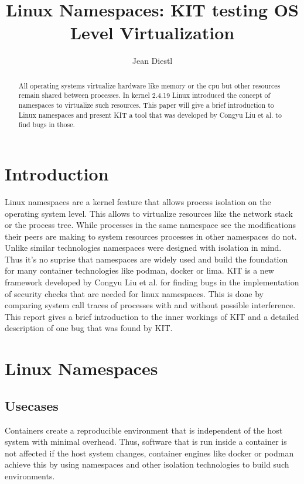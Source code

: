 \documentclass[10pt,twocolumn,a4paper]{article}
\author{Jean Diestl}
\begin{document}
\title{Linux Namespaces: KIT testing OS Level Virtualization}

\newcommand{\todo}[1]{{\texttt{[#1]}}}
\newcommand{\code}[1]{{\tt \small{#1}}}

\maketitle
\lstset{language=C, basicstyle=\ttfamily,
        columns=fullflexible,
        string=[b]', showspaces=false, showtabs=false,
         captionpos=b,
        framerule=1pt,
        breaklines=true, breakatwhitespace=true,
        autogobble=true}


\begin{abstract}
All operating systems virtualize hardware like memory or the cpu but other resources remain shared between processes.
In kernel 2.4.19 Linux introduced the concept of namespaces to virtualize such resources. This paper will give a brief 
introduction to Linux namespaces and present KIT a tool that was developed by Congyu Liu et al. to
find bugs in those.
\end{abstract}

\section{Introduction}\label{sec:introduction}
Linux namespaces are a kernel feature that allows process isolation on the operating system level.
This allows to virtualize resources like the network stack or the process tree.
While processes in the same namespace see the modifications their peers are making to system resources
processes in other namespaces do not. Unlike similar technologies namespaces were designed with
isolation in mind. Thus it's no suprise that namespaces are widely used and build the foundation
for many container technologies like podman, docker or lima.
KIT is a new framework developed by Congyu Liu et al. for finding bugs in the implementation of
security checks that are needed for linux namespaces\cite{0}. 
This is done by comparing system call traces of processes with and without possible interference.
This report gives a brief introduction to the inner
workings of KIT and a detailed description of one bug
that was found by KIT. 

\section{Linux Namespaces}
\subsection{Usecases}
Containers create a reproducible environment that is independent of the host system with minimal overhead.
Thus, software that is run inside a container is not affected if the host system changes, 
container engines like docker or podman achieve this by using namespaces and other isolation
technologies to build such environments.
\end{document}
